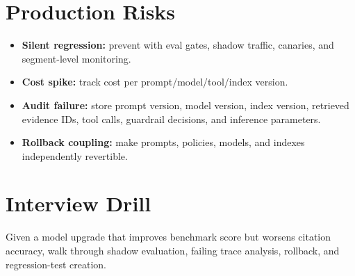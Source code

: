 \section*{Production Risks}
\begin{itemize}
  \item \textbf{Silent regression:} prevent with eval gates, shadow traffic, canaries, and segment-level monitoring.
  \item \textbf{Cost spike:} track cost per prompt/model/tool/index version.
  \item \textbf{Audit failure:} store prompt version, model version, index version, retrieved evidence IDs, tool calls, guardrail decisions, and inference parameters.
  \item \textbf{Rollback coupling:} make prompts, policies, models, and indexes independently revertible.
\end{itemize}

\section*{Interview Drill}
Given a model upgrade that improves benchmark score but worsens citation accuracy, walk through shadow evaluation, failing trace analysis, rollback, and regression-test creation.

